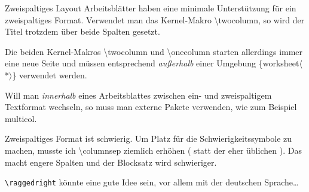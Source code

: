 \documentclass[hyperworksheet,pgfplots]{drcschool}
\newcommand*{\cs}[1]{\textup{\ttfamily\textbackslash#1}}                   %
\newcommand*{\pkg}[1]{\textup{\ttfamily#1}}                                %
\newcommand*{\opt}[1]{\textup{\ttfamily#1}}                                %
\newcommand*{\env}[1]{\textup{\ttfamily\{#1\}}}                            %
\newcommand*{\optstar}{\mbox{\ttfamily$\langle$*$\rangle$}}                %
\begin{document}
\begin{worksheet}{Zweispaltiges Layout}
Arbeitsblätter haben eine minimale Unterstützung für ein zweispaltiges Format.
Verwendet man das Kernel-Makro \cs{twocolumn}, so wird der Titel trotzdem über
beide Spalten gesetzt.

Die beiden Kernel-Makros \cs{twocolumn} und \cs{onecolumn} starten
allerdings immer eine neue Seite und müssen entsprechend \emph{außerhalb}
einer Umgebung \env{worksheet\optstar} verwendet werden.

Will man \emph{innerhalb} eines Arbeitsblattes zwischen ein- und zweispaltigem
Textformat wechseln, so muss man externe Pakete verwenden, wie zum Beispiel
\pkg{multicol}.

\medium\exercise[Foo]
\lipsum[1-3]

\easy\exercise
Zweispaltiges Format ist schwierig. Um Platz für die Schwierigkeitssymbole
zu machen, musste ich \cs{columnsep} ziemlich erhöhen (\opt{24pt} statt der
eher üblichen \opt{10pt}). Das macht engere Spalten und der Blocksatz
wird schwieriger.

\verb=\raggedright= könnte eine gute Idee sein, vor allem mit der deutschen Sprache\ldots

\end{worksheet}

\onecolumn

\end{document}
